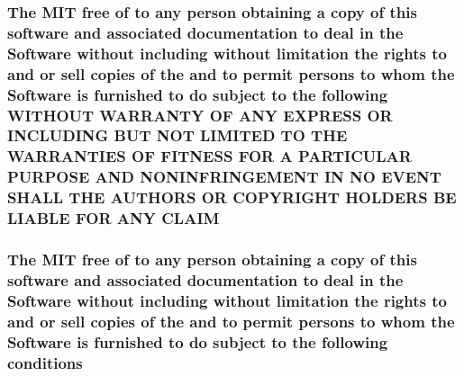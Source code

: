 \subsubsection[{C\+L\+A\+I\+M}]{\setlength{\rightskip}{0pt plus 5cm}The M\+I\+T free of to any person obtaining a {\bf copy} of this software and associated documentation to deal in the {\bf Software} without including without limitation the rights to and or sell copies of the and to permit persons to whom the {\bf Software} is furnished to do subject to the following W\+I\+T\+H\+O\+U\+T W\+A\+R\+R\+A\+N\+T\+Y O\+F A\+N\+Y E\+X\+P\+R\+E\+S\+S O\+R I\+N\+C\+L\+U\+D\+I\+N\+G B\+U\+T N\+O\+T L\+I\+M\+I\+T\+E\+D T\+O T\+H\+E W\+A\+R\+R\+A\+N\+T\+I\+E\+S O\+F F\+I\+T\+N\+E\+S\+S F\+O\+R A P\+A\+R\+T\+I\+C\+U\+L\+A\+R P\+U\+R\+P\+O\+S\+E A\+N\+D N\+O\+N\+I\+N\+F\+R\+I\+N\+G\+E\+M\+E\+N\+T I\+N N\+O E\+V\+E\+N\+T S\+H\+A\+L\+L T\+H\+E A\+U\+T\+H\+O\+R\+S O\+R C\+O\+P\+Y\+R\+I\+G\+H\+T H\+O\+L\+D\+E\+R\+S B\+E L\+I\+A\+B\+L\+E F\+O\+R A\+N\+Y C\+L\+A\+I\+M}\label{license_8txt_a6748037be7bf72df72169eafdc8c492e}
\hypertarget{license_8txt_a9519688b6bdbbccdcec5fef05966b25b}{}
\subsubsection[{conditions}]{\setlength{\rightskip}{0pt plus 5cm}The M\+I\+T free of to any person obtaining a {\bf copy} of this software and associated documentation to deal in the {\bf Software} without including without limitation the rights to and or sell copies of the and to permit persons to whom the {\bf Software} is furnished to do subject to the following conditions}\label{license_8txt_a9519688b6bdbbccdcec5fef05966b25b}
\hypertarget{license_8txt_a808df707d490e1041f54a1d24fbbfaa0}{}
